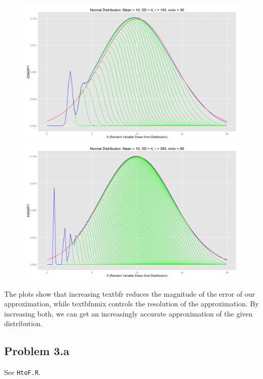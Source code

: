 \documentclass[letter]{article}
\begin{document}
\begin{figure}[H]
\includegraphics[scale=.27]{normdist_10_4_100_30.png}\\
\includegraphics[scale=.54]{normdist_10_4_300_90.png}
\end{figure}

\newpage

The plots show that increasing textbf{r} reduces the magnitude of the error of our approximation, while textbf{nmix} controls the resolution of the approximation.  By increasing both, we can get an increasingly accurate approximation of the given distribution.

\subsection*{Problem 3.a}
See \texttt{HtoF.R}. 

\end{document}
